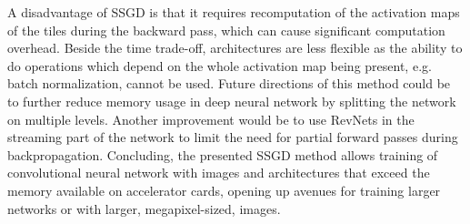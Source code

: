 \documentclass{article}
\begin{document}
A disadvantage of SSGD is that it requires recomputation of the activation maps of the tiles during the backward pass, which can cause significant computation overhead. Beside the time trade-off, architectures are less flexible as the ability to do operations which depend on the whole activation map being present, e.g. batch normalization, cannot be used. Future directions of this method could be to further reduce memory usage in deep neural network by splitting the network on multiple levels. Another improvement would be to use RevNets in the streaming part of the network to limit the need for partial forward passes during backpropagation. Concluding, the presented SSGD method allows training of convolutional neural network with images and architectures that exceed the memory available on accelerator cards, opening up avenues for training larger networks or with larger, megapixel-sized, images.

\small


\end{document}
